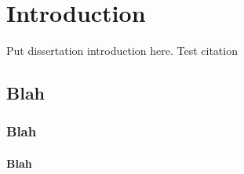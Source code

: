 \chapter*{Introduction} %
Put dissertation introduction here.
Test citation~\cite{dean2011characterization}

\section{Blah}
\subsection{Blah}
\subsubsection{Blah}

